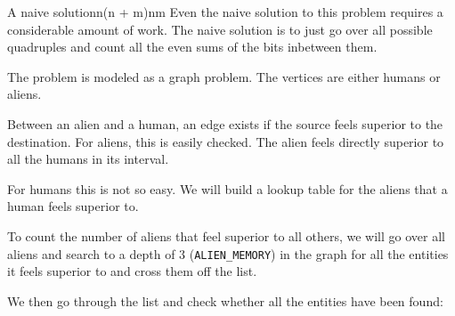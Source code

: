 \documentclass{writeup}
\begin{document}
\begin{solutions}
  \begin{solution}{A naive solution}{n(n + m)}{nm}
    Even the naive solution to this problem requires a considerable amount of work.
    The naive solution is to just go over all possible quadruples and count all the even sums of the bits inbetween them.

    The problem is modeled as a graph problem.
    The vertices are either humans or aliens.


    Between an alien and a human, an edge exists if the source feels superior to the destination.
    For aliens, this is easily checked.
    The alien feels directly superior to all the humans in its interval.


    For humans this is not so easy.
    We will build a lookup table for the aliens that a human feels superior to.


    To count the number of aliens that feel superior to all others, we will go over all aliens and search to a depth of $3$ (\texttt{ALIEN_MEMORY}) in the graph for all the entities it feels superior to and cross them off the list.


    We then go through the list and check whether all the entities have been found:

  \end{solution}
\end{solutions}
\end{document}
